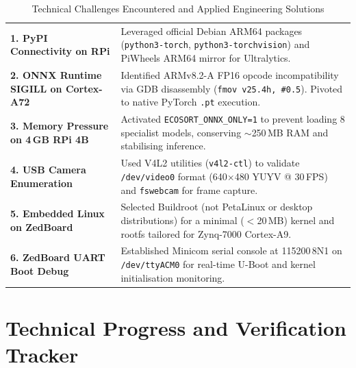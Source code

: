 \documentclass[12pt,a4paper]{article}
\begin{document}
\renewcommand{\arraystretch}{1.35}
\begin{table}[H]
\centering
\caption{Technical Challenges Encountered and Applied Engineering Solutions}
\label{tab:challenges}
\small
\begin{tabularx}{\linewidth}{@{} L{4.0cm} X @{}}
\toprule
{} &  \\
\midrule
{}
\textbf{1. PyPI Connectivity on RPi}
  & Leveraged official Debian ARM64 packages (\texttt{python3-torch},
    \texttt{python3-torchvision}) and PiWheels ARM64 mirror for Ultralytics. \\

\textbf{2. ONNX Runtime SIGILL on Cortex-A72}
  & Identified ARMv8.2-A FP16 opcode incompatibility via GDB disassembly
    (\texttt{fmov v25.4h, \#0.5}). Pivoted to native PyTorch \texttt{.pt} execution. \\

\textbf{3. Memory Pressure on 4\,GB RPi 4B}
  & Activated \texttt{ECOSORT\_ONNX\_ONLY=1} to prevent loading 8 specialist models,
    conserving $\sim$250\,MB RAM and stabilising inference. \\

\textbf{4. USB Camera Enumeration}
  & Used V4L2 utilities (\texttt{v4l2-ctl}) to validate \texttt{/dev/video0}
    format (640$\times$480 YUYV @ 30\,FPS) and \texttt{fswebcam} for frame capture. \\

\textbf{5. Embedded Linux on ZedBoard}
  & Selected Buildroot (not PetaLinux or desktop distributions) for a minimal
    ($<$20\,MB) kernel and rootfs tailored for Zynq-7000 Cortex-A9. \\

\textbf{6. ZedBoard UART Boot Debug}
  & Established Minicom serial console at 115200\,8N1 on \texttt{/dev/ttyACM0}
    for real-time U-Boot and kernel initialisation monitoring. \\
\bottomrule
\end{tabularx}
\end{table}

\clearpage

\section{Technical Progress and Verification Tracker}
\end{document}
